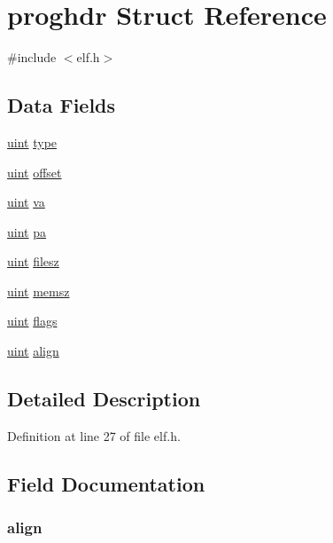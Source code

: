 \hypertarget{structproghdr}{\section{proghdr Struct Reference}
\label{structproghdr}
}


{\ttfamily \#include $<$elf.\-h$>$}

\subsection*{Data Fields}
\begin{DoxyCompactItemize}
\item 
\hyperlink{types_8h_a91ad9478d81a7aaf2593e8d9c3d06a14}{uint} \hyperlink{structproghdr_a4e4020c6e82bee6562d5bc3c1657cafe}{type}
\item 
\hyperlink{types_8h_a91ad9478d81a7aaf2593e8d9c3d06a14}{uint} \hyperlink{structproghdr_abb6eef28c6175ceaae40067c5761fb3c}{offset}
\item 
\hyperlink{types_8h_a91ad9478d81a7aaf2593e8d9c3d06a14}{uint} \hyperlink{structproghdr_a24266ece98365336cbbb0f5cbb092148}{va}
\item 
\hyperlink{types_8h_a91ad9478d81a7aaf2593e8d9c3d06a14}{uint} \hyperlink{structproghdr_adc03a600d1b3918826d34dfb0c4bf1ab}{pa}
\item 
\hyperlink{types_8h_a91ad9478d81a7aaf2593e8d9c3d06a14}{uint} \hyperlink{structproghdr_af68648ec9784a595235d016a78d4e443}{filesz}
\item 
\hyperlink{types_8h_a91ad9478d81a7aaf2593e8d9c3d06a14}{uint} \hyperlink{structproghdr_adda66e6aa36c4d480d9a96db0653f1c0}{memsz}
\item 
\hyperlink{types_8h_a91ad9478d81a7aaf2593e8d9c3d06a14}{uint} \hyperlink{structproghdr_a660f9db871d26052904976a8bfe8432d}{flags}
\item 
\hyperlink{types_8h_a91ad9478d81a7aaf2593e8d9c3d06a14}{uint} \hyperlink{structproghdr_a8a93f1094c7ddc65184ffb84a9059862}{align}
\end{DoxyCompactItemize}


\subsection{Detailed Description}


Definition at line 27 of file elf.\-h.



\subsection{Field Documentation}
\hypertarget{structproghdr_a8a93f1094c7ddc65184ffb84a9059862}{
\subsubsection[{align}]{ align}}\label{structproghdr_a8a93f1094c7ddc65184ffb84a9059862}


